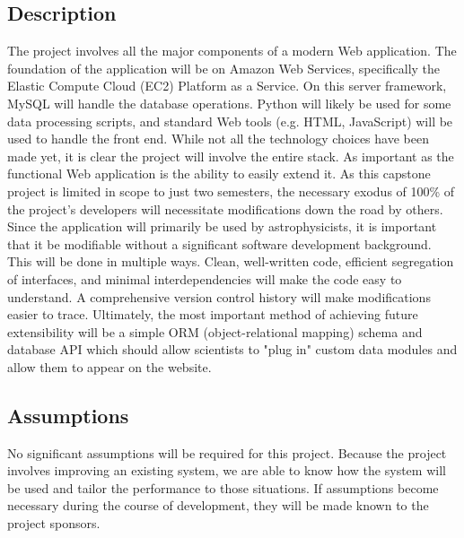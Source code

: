 \documentclass[12pt]{article}
\begin{document}
\begin{spacing}{1.5}
\subsection{Description}
The project involves all the major components of a modern Web application. The foundation of the application will be on Amazon Web Services, specifically the Elastic Compute Cloud (EC2) Platform as a Service. On this server framework, MySQL will handle the database operations. Python will likely be used for some data processing scripts, and standard Web tools (e.g. HTML, JavaScript) will be used to handle the front end. While not all the technology choices have been made yet, it is clear the project will involve the entire stack.
\newline \newline
As important as the functional Web application is the ability to easily extend it. As this capstone project is limited in scope to just two semesters, the necessary exodus of 100\% of the project's developers will necessitate modifications down the road by others. Since the application will primarily be used by astrophysicists, it is important that it be modifiable without a significant software development background. This will be done in multiple ways. Clean, well-written code, efficient segregation of interfaces, and minimal interdependencies will make the code easy to understand. A comprehensive version control history will make modifications easier to trace. Ultimately, the most important method of achieving future extensibility will be a simple ORM (object-relational mapping) schema and database API which should allow scientists to "plug in" custom data modules and allow them to appear on the website.

\subsection{Assumptions}
No significant assumptions will be required for this project. Because the project involves improving an existing system, we are able to know how the system will be used and tailor the performance to those situations. If assumptions become necessary during the course of development, they will be made known to the project sponsors.

\newpage


\end{spacing}
\end{document}
